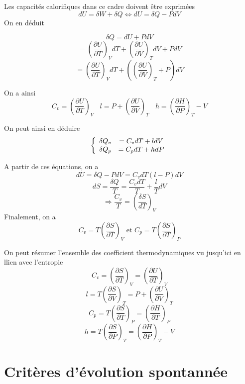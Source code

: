 Les capacités calorifiques dans ce cadre doivent être exprimées
$$dU = \delta W + \delta Q \Leftrightarrow dU=\delta Q -PdV$$
On en déduit


$$\delta Q = dU + PdV$$
 $$= \left ( \frac{\partial U}{\partial T}\right ) _V dT + \left ( \frac{\partial U}{\partial V}\right )_T dV + PdV$$
 $$= \left ( \frac{\partial U}{\partial T}\right ) _V dT + \left ( \left ( \frac{\partial U}{\partial V}\right)_T+P \right ) dV$$
 
 On a ainsi
 $$C_v=\left ( \frac{\partial U}{\partial T}\right ) _V ~~~~ l=P+\left ( \frac{\partial U}{\partial V}\right )_T ~~~~ h=\left ( \frac{\partial H}{\partial P}\right ) _T -V$$


 On peut ainsi en déduire
 \begin{equation}
 \left \{ \begin{array}{c c} \delta Q_v &= C_vdT + ldV\\ \delta Q_p &= C_pdT + hdP \end{array} \right.
 \end{equation}
 
 A partir de ces équations, on a
 $$dU = \delta Q - PdV = C_vdT(l-P)dV$$
 $$dS=\frac{\delta Q}{T} = \frac{C_vdT}{T}+\frac{l}{T}dV$$
$$\Rightarrow \frac{C_v}{T} = \left ( \frac{\delta S}{dT}\right ) _V$$
Finalement, on a 
\begin{equation}
C_v=T\left ( \frac{\partial S}{\partial T}\right ) _V \textrm{    et    }C_p=T\left ( \frac{\partial S}{\partial T} \right )_P
\end{equation}

\begin{definition}

 On peut résumer l'ensemble des coefficient thermodynamiques vu jusqu'ici en llien avec l'entropie
$$C_v = \left ( \frac{\partial S}{\partial T}\right ) _ V = \left ( \frac{\partial U}{\partial T}\right ) _ V$$
$$l = T \left ( \frac{\partial S}{\partial V} \right ) _T = P + \left ( \frac{\partial U }{\partial V}\right ) _T$$
$$C_p = T\left ( \frac{\partial S}{\partial T}\right ) _P = \left ( \frac{\partial H }{\partial T}\right ) _P$$
$$h = T\left ( \frac{\partial S}{\partial P}\right )_T = \left ( \frac{\partial H}{\partial P}\right )_T-V$$
\end{definition}

\section{Critères d'évolution spontannée}

